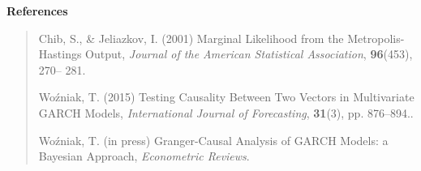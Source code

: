 \documentclass[final,3p,authoryear]{elsarticle}
\begin{document}
\bigskip\noindent\textbf{References}
\begin{quote}

\noindent Chib, S., \& Jeliazkov, I. (2001) Marginal Likelihood from the Metropolis-Hastings Output, \emph{Journal of the American Statistical Association}, \textbf{96}(453), 270– 281.

\noindent Wo\'zniak, T. (2015) Testing Causality Between Two Vectors in Multivariate GARCH Models, \emph{International Journal of Forecasting}, \textbf{31}(3), pp. 876--894..

\smallskip\noindent Wo\'zniak, T. (in press) Granger-Causal Analysis of GARCH Models: a Bayesian Approach, \emph{Econometric Reviews}.

\end{quote}
\end{document}
